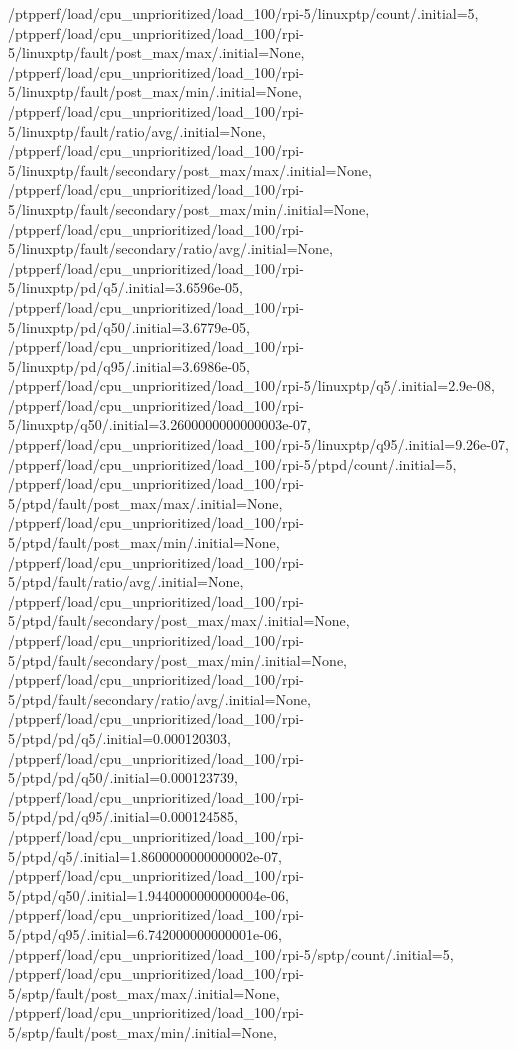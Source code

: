 {    /ptpperf/load/cpu_unprioritized/load_100/rpi-5/linuxptp/count/.initial=5,
    /ptpperf/load/cpu_unprioritized/load_100/rpi-5/linuxptp/fault/post_max/max/.initial=None,
    /ptpperf/load/cpu_unprioritized/load_100/rpi-5/linuxptp/fault/post_max/min/.initial=None,
    /ptpperf/load/cpu_unprioritized/load_100/rpi-5/linuxptp/fault/ratio/avg/.initial=None,
    /ptpperf/load/cpu_unprioritized/load_100/rpi-5/linuxptp/fault/secondary/post_max/max/.initial=None,
    /ptpperf/load/cpu_unprioritized/load_100/rpi-5/linuxptp/fault/secondary/post_max/min/.initial=None,
    /ptpperf/load/cpu_unprioritized/load_100/rpi-5/linuxptp/fault/secondary/ratio/avg/.initial=None,
    /ptpperf/load/cpu_unprioritized/load_100/rpi-5/linuxptp/pd/q5/.initial=3.6596e-05,
    /ptpperf/load/cpu_unprioritized/load_100/rpi-5/linuxptp/pd/q50/.initial=3.6779e-05,
    /ptpperf/load/cpu_unprioritized/load_100/rpi-5/linuxptp/pd/q95/.initial=3.6986e-05,
    /ptpperf/load/cpu_unprioritized/load_100/rpi-5/linuxptp/q5/.initial=2.9e-08,
    /ptpperf/load/cpu_unprioritized/load_100/rpi-5/linuxptp/q50/.initial=3.2600000000000003e-07,
    /ptpperf/load/cpu_unprioritized/load_100/rpi-5/linuxptp/q95/.initial=9.26e-07,
    /ptpperf/load/cpu_unprioritized/load_100/rpi-5/ptpd/count/.initial=5,
    /ptpperf/load/cpu_unprioritized/load_100/rpi-5/ptpd/fault/post_max/max/.initial=None,
    /ptpperf/load/cpu_unprioritized/load_100/rpi-5/ptpd/fault/post_max/min/.initial=None,
    /ptpperf/load/cpu_unprioritized/load_100/rpi-5/ptpd/fault/ratio/avg/.initial=None,
    /ptpperf/load/cpu_unprioritized/load_100/rpi-5/ptpd/fault/secondary/post_max/max/.initial=None,
    /ptpperf/load/cpu_unprioritized/load_100/rpi-5/ptpd/fault/secondary/post_max/min/.initial=None,
    /ptpperf/load/cpu_unprioritized/load_100/rpi-5/ptpd/fault/secondary/ratio/avg/.initial=None,
    /ptpperf/load/cpu_unprioritized/load_100/rpi-5/ptpd/pd/q5/.initial=0.000120303,
    /ptpperf/load/cpu_unprioritized/load_100/rpi-5/ptpd/pd/q50/.initial=0.000123739,
    /ptpperf/load/cpu_unprioritized/load_100/rpi-5/ptpd/pd/q95/.initial=0.000124585,
    /ptpperf/load/cpu_unprioritized/load_100/rpi-5/ptpd/q5/.initial=1.8600000000000002e-07,
    /ptpperf/load/cpu_unprioritized/load_100/rpi-5/ptpd/q50/.initial=1.9440000000000004e-06,
    /ptpperf/load/cpu_unprioritized/load_100/rpi-5/ptpd/q95/.initial=6.742000000000001e-06,
    /ptpperf/load/cpu_unprioritized/load_100/rpi-5/sptp/count/.initial=5,
    /ptpperf/load/cpu_unprioritized/load_100/rpi-5/sptp/fault/post_max/max/.initial=None,
    /ptpperf/load/cpu_unprioritized/load_100/rpi-5/sptp/fault/post_max/min/.initial=None,
}
